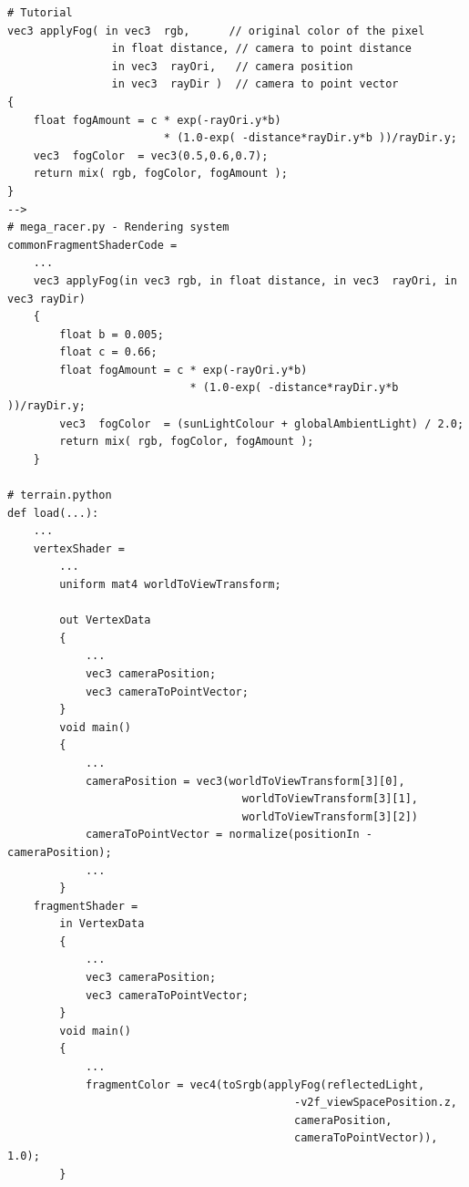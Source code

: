 \documentclass[a4 paper, 12pt]{article}
\begin{document}
    \begin{lstlisting}
# Tutorial
vec3 applyFog( in vec3  rgb,      // original color of the pixel
                in float distance, // camera to point distance
                in vec3  rayOri,   // camera position
                in vec3  rayDir )  // camera to point vector
{
    float fogAmount = c * exp(-rayOri.y*b) 
                        * (1.0-exp( -distance*rayDir.y*b ))/rayDir.y;
    vec3  fogColor  = vec3(0.5,0.6,0.7);
    return mix( rgb, fogColor, fogAmount );
}
-->
# mega_racer.py - Rendering system
commonFragmentShaderCode = 
    ...
    vec3 applyFog(in vec3 rgb, in float distance, in vec3  rayOri, in vec3 rayDir)
    {
        float b = 0.005;
        float c = 0.66;
        float fogAmount = c * exp(-rayOri.y*b) 
                            * (1.0-exp( -distance*rayDir.y*b ))/rayDir.y;
        vec3  fogColor  = (sunLightColour + globalAmbientLight) / 2.0;
        return mix( rgb, fogColor, fogAmount );
    }

# terrain.python
def load(...):
    ...
    vertexShader =
        ...
        uniform mat4 worldToViewTransform;

        out VertexData
        {
            ...
            vec3 cameraPosition;
            vec3 cameraToPointVector;
        }
        void main()
        {
            ...
            cameraPosition = vec3(worldToViewTransform[3][0],
                                    worldToViewTransform[3][1],
                                    worldToViewTransform[3][2])
            cameraToPointVector = normalize(positionIn - cameraPosition);
            ...
        }
    fragmentShader = 
        in VertexData
        {
            ...
            vec3 cameraPosition;
            vec3 cameraToPointVector;
        }
        void main()
        {
            ...
            fragmentColor = vec4(toSrgb(applyFog(reflectedLight, 
                                            -v2f_viewSpacePosition.z, 
                                            cameraPosition, 
                                            cameraToPointVector)), 1.0);
        }
    \end{lstlisting} 
\end{document}
